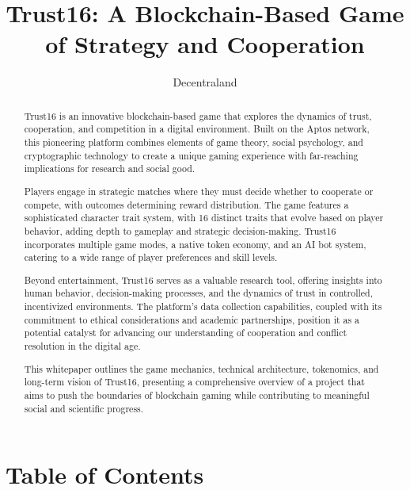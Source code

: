 \documentclass[]{article}
\begin{document}
\title{Trust16: A Blockchain-Based Game of Strategy and
Cooperation}
\author{Decentraland}
\maketitle

\begin{abstract}
Trust16 is an innovative blockchain-based game that explores the dynamics of trust, cooperation, and competition in a digital environment. Built on the Aptos network, this pioneering platform combines elements of game theory, social psychology, and cryptographic technology to create a unique gaming experience with far-reaching implications for research and social good.

Players engage in strategic matches where they must decide whether to cooperate or compete, with outcomes determining reward distribution. The game features a sophisticated character trait system, with 16 distinct traits that evolve based on player behavior, adding depth to gameplay and strategic decision-making. Trust16 incorporates multiple game modes, a native token economy, and an AI bot system, catering to a wide range of player preferences and skill levels.

Beyond entertainment, Trust16 serves as a valuable research tool, offering insights into human behavior, decision-making processes, and the dynamics of trust in controlled, incentivized environments. The platform's data collection capabilities, coupled with its commitment to ethical considerations and academic partnerships, position it as a potential catalyst for advancing our understanding of cooperation and conflict resolution in the digital age.

This whitepaper outlines the game mechanics, technical architecture, tokenomics, and long-term vision of Trust16, presenting a comprehensive overview of a project that aims to push the boundaries of blockchain gaming while contributing to meaningful social and scientific progress.
\end{abstract}

\hypertarget{table-of-contents}{%
\section{Table of Contents}\label{table-of-contents}}
\end{document}
